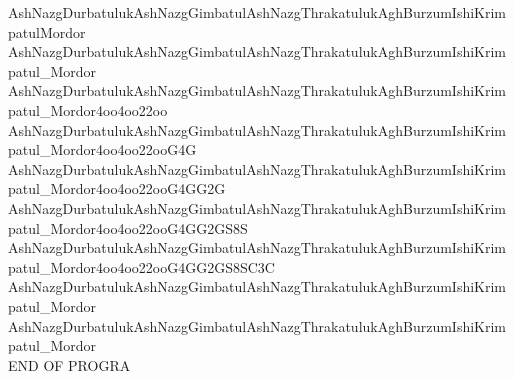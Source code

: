 \documentclass[]{article}
\begin{document}
{{AshNazgDurbatulukAshNazgGimbatulAshNazgThrakatulukAghBurzumIshiKrimpatulMordor\\
AshNazgDurbatulukAshNazgGimbatulAshNazgThrakatulukAghBurzumIshiKrimpatul\_Mordor\\
AshNazgDurbatulukAshNazgGimbatulAshNazgThrakatulukAghBurzumIshiKrimpatul\_Mordor4oo4oo22oo
AshNazgDurbatulukAshNazgGimbatulAshNazgThrakatulukAghBurzumIshiKrimpatul\_Mordor4oo4oo22ooG4G\\
AshNazgDurbatulukAshNazgGimbatulAshNazgThrakatulukAghBurzumIshiKrimpatul\_Mordor4oo4oo22ooG4GG2G\\
AshNazgDurbatulukAshNazgGimbatulAshNazgThrakatulukAghBurzumIshiKrimpatul\_Mordor4oo4oo22ooG4GG2GS8S\\
AshNazgDurbatulukAshNazgGimbatulAshNazgThrakatulukAghBurzumIshiKrimpatul\_Mordor4oo4oo22ooG4GG2GS8SC3C\\
AshNazgDurbatulukAshNazgGimbatulAshNazgThrakatulukAghBurzumIshiKrimpatul\_Mordor\\
AshNazgDurbatulukAshNazgGimbatulAshNazgThrakatulukAghBurzumIshiKrimpatul\_Mordor\\}
END OF PROGRA
}
\end{document}
